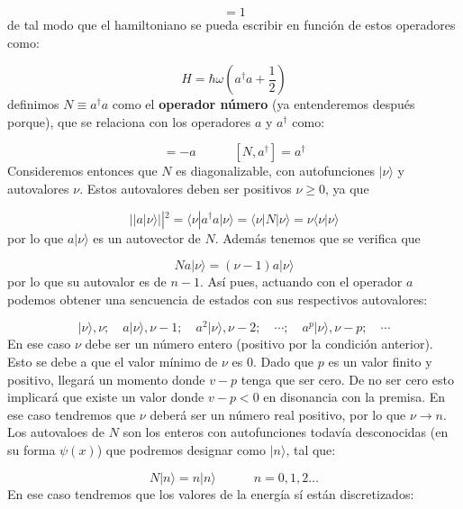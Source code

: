 \documentclass[12pt,a4paper]{book}
\numberwithin{equation}{chapter}
\numberwithin{figure}{chapter}
\newcommand{\tquad}{\quad \quad \quad}
\newcommand{\parentesis}[1]{\left( #1  \right)}
\begin{document}
\begin{equation}
[a,a^\dagger]=1
\end{equation}
de tal modo que el hamiltoniano se pueda escribir en función de estos operadores como:

\begin{equation}
H = \hbar \omega \parentesis{a^\dagger a + \frac{1}{2}}
\end{equation}
definimos $N\equiv a^\dagger a$ como el \textbf{operador número} (ya entenderemos después porque), que se relaciona con los operadores $a$ y $a^\dagger$ como:

\begin{equation}
[N,a] = -a \tquad [N,a^\dagger] = a^{\dagger}
\end{equation}
Consideremos entonces que $N$ es diagonalizable, con autofunciones $|\nu\rangle$ y autovalores $\nu$. Estos autovalores deben ser positivos $\nu \geq 0$, ya que

\begin{equation}
|| a |\nu\rangle ||^2 = \langle \nu | a^\dagger a | \nu \rangle = \langle \nu | N  | \nu \rangle = \nu \langle \nu | \nu \rangle
\end{equation}
por lo que $a|\nu\rangle$ es un autovector de $N$. Además tenemos que se verifica que

\begin{equation}
N a |\nu \rangle = (\nu -1) a |\nu \rangle
\end{equation}
por lo que su autovalor es de $n-1$. Así pues, actuando con el operador $a$ podemos obtener una sencuencia de estados con sus respectivos autovalores:

\begin{equation}
|\nu\rangle,\nu; \quad  a |\nu\rangle, \nu-1; \quad a^2|\nu\rangle, \nu-2; \quad \cdots;  \quad a^p |\nu \rangle, \nu-p; \quad \cdots
\end{equation}
En ese caso $\nu$ debe ser un número entero (positivo por la condición anterior). Esto se debe a que el valor mínimo de $\nu$ es 0. Dado que $p$ es un valor finito y positivo, llegará un momento donde $v-p$ tenga que ser cero. De no ser cero esto implicará que existe un valor donde $v-p<0$ en disonancia con la premisa. En ese caso tendremos que $\nu$ deberá ser un número real positivo, por lo que $\nu\rightarrow n$. Los autovaloes de $N$ son los enteros con autofunciones todavía desconocidas  (en su forma $\psi(x)$) que podremos designar como $|n\rangle$, tal que:

\begin{equation}
N | n \rangle = n |n \rangle \tquad n = 0,1,2 \ldots
\end{equation}
En ese caso tendremos que los valores de la energía sí están discretizados:
\end{document}

